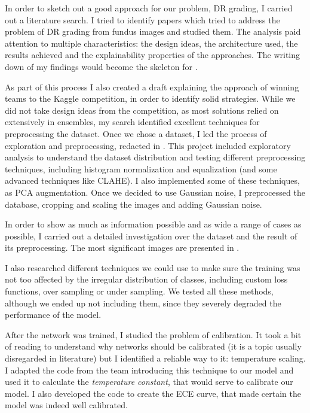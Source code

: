 In order to sketch out a good approach for our problem, DR grading, I carried out a literature search. I tried to identify papers which tried to address the problem of DR grading from fundus images and studied them. The analysis paid attention to multiple characteristics: the design ideas, the architecture used, the results achieved and the explainability properties of the approaches. The writing down of my findings would become the skeleton for .

As part of this process I also created a draft explaining the approach of winning teams to the Kaggle competition, in order to identify solid strategies. While we did not take design ideas from the competition, as most solutions relied on extensively in ensembles, my search identified excellent techniques for preprocessing the dataset. Once we chose a dataset, I led the process of exploration and preprocessing, redacted in . This project included exploratory analysis to understand the dataset distribution and testing different preprocessing techniques, including histogram normalization and equalization (and some advanced techniques like CLAHE). I also implemented some of these techniques, as PCA augmentation. Once we decided to use Gaussian noise, I preprocessed the database, cropping and scaling the images and adding Gaussian noise.

In order to show as much as information possible and as wide a range of cases as possible, I carried out a detailed investigation over the dataset and the result of its preprocessing. The most significant images are presented in .

I also researched different techniques we could use to make sure the training was not too affected by the irregular distribution of classes, including custom loss functions, over sampling or under sampling. We tested all these methods, although we ended up not including them, since they severely degraded the performance of the model.

After the network was trained, I studied the problem of calibration. It took a bit of reading to understand why networks should be calibrated (it is a topic usually disregarded in literature) but I identified a reliable way to it: temperature scaling. I adapted the code from the team introducing this technique to our model and used it to calculate the \textit{temperature constant}, that would serve to calibrate our model. I also developed the code to create the ECE curve, that made certain the model was indeed well calibrated.

